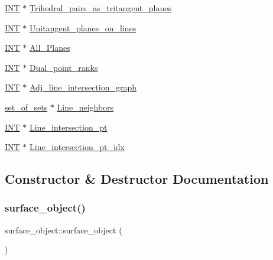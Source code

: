 \begin{DoxyCompactItemize}
\mbox{\hyperlink{galois_8h_a09fddde158a3a20bd2dcadb609de11dc}{I\+NT}} $\ast$ \mbox{\hyperlink{classsurface__object_a83fcf91f80006b8bddf016c4b64dc0d5}{Trihedral\+\_\+pairs\+\_\+as\+\_\+tritangent\+\_\+planes}}
\item 
\mbox{\hyperlink{galois_8h_a09fddde158a3a20bd2dcadb609de11dc}{I\+NT}} $\ast$ \mbox{\hyperlink{classsurface__object_a8c481aad84aaad8ab805161a9d169429}{Unitangent\+\_\+planes\+\_\+on\+\_\+lines}}
\item 
\mbox{\hyperlink{galois_8h_a09fddde158a3a20bd2dcadb609de11dc}{I\+NT}} $\ast$ \mbox{\hyperlink{classsurface__object_a5daceb0f552a2bbcda9a13c3b1e6a3b4}{All\+\_\+\+Planes}}
\item 
\mbox{\hyperlink{galois_8h_a09fddde158a3a20bd2dcadb609de11dc}{I\+NT}} $\ast$ \mbox{\hyperlink{classsurface__object_a4b76e3446e0122f90ced48cc5b765ca3}{Dual\+\_\+point\+\_\+ranks}}
\item 
\mbox{\hyperlink{galois_8h_a09fddde158a3a20bd2dcadb609de11dc}{I\+NT}} $\ast$ \mbox{\hyperlink{classsurface__object_ace7b0b8dfb6ddb4b14cfce1f8cddeab1}{Adj\+\_\+line\+\_\+intersection\+\_\+graph}}
\item 
\mbox{\hyperlink{classset__of__sets}{set\+\_\+of\+\_\+sets}} $\ast$ \mbox{\hyperlink{classsurface__object_a06e62075f093e7b6c287ba6c11df8ea6}{Line\+\_\+neighbors}}
\item 
\mbox{\hyperlink{galois_8h_a09fddde158a3a20bd2dcadb609de11dc}{I\+NT}} $\ast$ \mbox{\hyperlink{classsurface__object_a3e07583d2134b589e9c4ca0988882061}{Line\+\_\+intersection\+\_\+pt}}
\item 
\mbox{\hyperlink{galois_8h_a09fddde158a3a20bd2dcadb609de11dc}{I\+NT}} $\ast$ \mbox{\hyperlink{classsurface__object_a7d8f5c7075dd8852209c9189e9bcfece}{Line\+\_\+intersection\+\_\+pt\+\_\+idx}}
\end{DoxyCompactItemize}


\subsection{Constructor \& Destructor Documentation}
\mbox{\label{classsurface__object_a73ac72eb094e7a6a72c3af701e2a4c6f}} 
\subsubsection{\texorpdfstring{surface\+\_\+object()}{surface\_object()}}
{\footnotesize\ttfamily surface\+\_\+object\+::surface\+\_\+object (\begin{DoxyParamCaption}{ }\end{DoxyParamCaption})}

